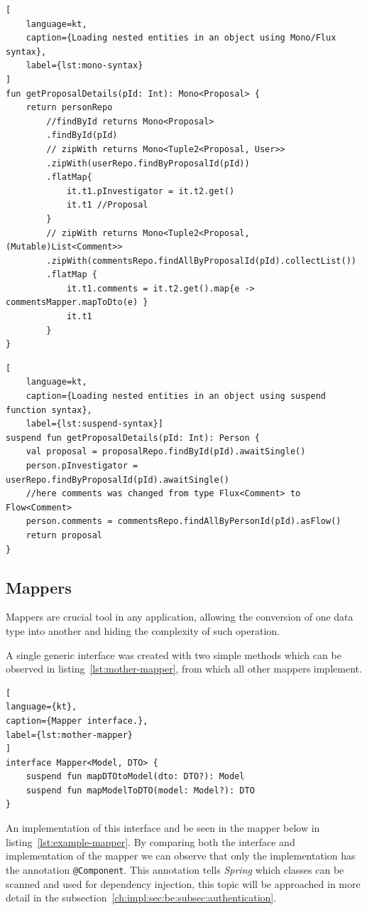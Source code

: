 \begin{lstlisting}[
    language=kt, 
    caption={Loading nested entities in an object using Mono/Flux syntax}, 
    label={lst:mono-syntax}
]
fun getProposalDetails(pId: Int): Mono<Proposal> {
    return personRepo
        //findById returns Mono<Proposal>
        .findById(pId) 
        // zipWith returns Mono<Tuple2<Proposal, User>>
        .zipWith(userRepo.findByProposalId(pId)) 
        .flatMap{ 
            it.t1.pInvestigator = it.t2.get()
            it.t1 //Proposal
        }
        // zipWith returns Mono<Tuple2<Proposal, (Mutable)List<Comment>>
        .zipWith(commentsRepo.findAllByProposalId(pId).collectList()) 
        .flatMap {
            it.t1.comments = it.t2.get().map{e ->  commentsMapper.mapToDto(e) }
            it.t1
        }
}    
\end{lstlisting}


\begin{lstlisting}[
    language=kt, 
    caption={Loading nested entities in an object using suspend function syntax},
    label={lst:suspend-syntax}]
suspend fun getProposalDetails(pId: Int): Person {
    val proposal = proposalRepo.findById(pId).awaitSingle()
    person.pInvestigator = userRepo.findByProposalId(pId).awaitSingle()
    //here comments was changed from type Flux<Comment> to Flow<Comment>
    person.comments = commentsRepo.findAllByPersonId(pId).asFlow()
    return proposal
}    
\end{lstlisting}


\subsection{Mappers}\label{ch:impl:sec:be:subsec:mappers}

Mappers are crucial tool in any application, allowing the conversion of one data type into another and hiding the complexity of such operation. 

A single generic interface was created with two simple methods which can be observed in listing~\ref{lst:mother-mapper}, from which all other mappers implement.

\begin{lstlisting}[
language={kt},
caption={Mapper interface.},
label={lst:mother-mapper}
]
interface Mapper<Model, DTO> {
    suspend fun mapDTOtoModel(dto: DTO?): Model
    suspend fun mapModelToDTO(model: Model?): DTO
}
\end{lstlisting}

An implementation of this interface and be seen in the mapper below in listing~\ref{lst:example-mapper}. By comparing both the interface and implementation of the mapper we can observe that only the implementation has the annotation \lstinline{@Component}. This annotation tells \textit{Spring} which classes can be scanned and used for dependency injection, this topic will be approached in more detail in the subsection~\ref{ch:impl:sec:be:subsec:authentication}.

